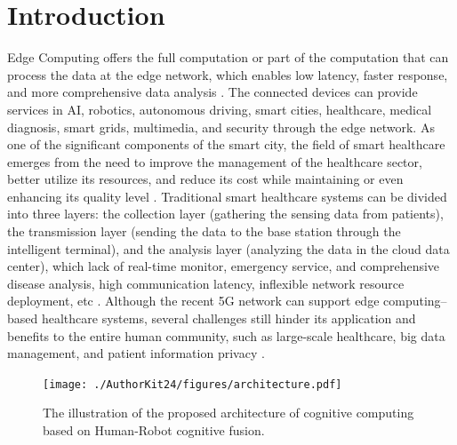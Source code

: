 \documentclass[letterpaper]{article} %
\begin{document}
\section{Introduction}

Edge Computing offers the full computation or part of the computation that can process the data at the edge network, which enables low latency, faster response, and more comprehensive data analysis \cite{khan2019edge}. The connected devices can provide services in AI, robotics, autonomous driving, smart cities, healthcare, medical diagnosis, smart grids, multimedia, and security through the edge network. As one of the significant components of the smart city, the field of smart healthcare emerges from the need to improve the management of the healthcare sector, better utilize its resources, and reduce its cost while maintaining or even enhancing its quality level \cite{oueida2018edge}. Traditional smart healthcare systems can be divided into three layers: the collection layer (gathering the sensing data from patients), the transmission layer (sending the data to the base station through the intelligent terminal), and the analysis layer (analyzing the data in the cloud data center), which lack of real-time monitor, emergency service, and comprehensive disease analysis, high communication latency, inflexible network resource deployment, etc \cite{chen2018edge}. Although the recent 5G network can support edge computing–based healthcare systems, several challenges still hinder its application and benefits to the entire human community, such as large-scale healthcare, big data management, and patient information privacy \cite{hartmann2022edge}.

\begin{figure}[t]
    \centering
    \texttt{[image: ./AuthorKit24/figures/architecture.pdf]}
    \caption{The illustration of the proposed architecture of cognitive computing based on Human-Robot cognitive fusion.}
    \label{fig:cognitive_computing_arch}
\end{figure}
\end{document}
